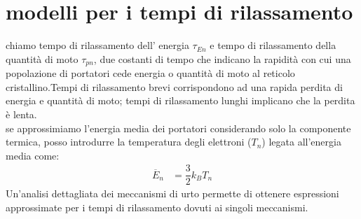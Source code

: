 \section{modelli per i tempi di rilassamento}
chiamo tempo di rilassamento dell' energia $\tau_{En}$ e tempo di rilassamento della quantità di moto $\tau_{pn}$, due costanti di tempo che indicano la rapidità con cui una popolazione di portatori cede energia o quantità di moto al reticolo cristallino.Tempi di rilassamento brevi corrispondono ad una rapida perdita di energia e quantità di moto; tempi di rilassamento lunghi implicano che la perdita è lenta. 
\\
se approssimiamo l'energia media dei portatori considerando solo la componente termica, posso introdurre la temperatura degli elettroni ($T_n$) legata all'energia media come:
%
\begin{align}
    \overline{E}_n &=\dfrac{3}{2}k_BT_n 
\end{align}
%
Un’analisi dettagliata dei meccanismi di urto permette di ottenere espressioni approssimate per i tempi di rilassamento dovuti ai singoli meccanismi. 


